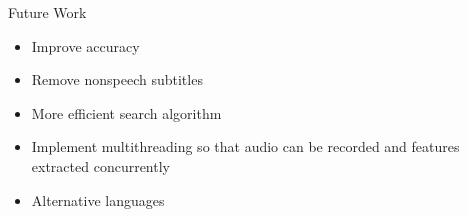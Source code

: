 \documentclass[notes]{beamer}
\begin{document}
\begin{frame}{Future Work}
\begin{itemize}
	\item Improve accuracy
	\item Remove nonspeech subtitles
	\item More efficient search algorithm
	\item Implement multithreading so that audio can be recorded and features extracted concurrently
	\item Alternative languages
\end{itemize}
\end{frame}
\end{document}
